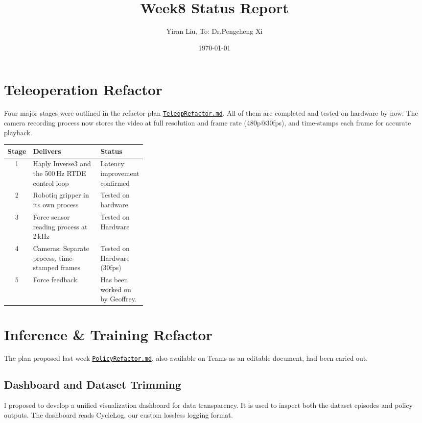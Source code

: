 \documentclass[11pt]{article}
\title{Week8 Status Report}
\author{Yiran Liu, To: Dr.Pengcheng Xi}
\date{\today}
\begin{document}
\maketitle

\section{Teleoperation Refactor}

Four major stages were outlined in the refactor plan \href{https://gitlabc.nrc-cnrc.gc.ca/Yiran.Liu/nrc_robot_manipulation/-/blob/teleop-refactor/Documentation/Journal/2026Sep/TeleopRefactor.md}{\texttt{TeleopRefactor.md}}. All of them are completed and tested on hardware by now. The camera recording process now stores the video at full resolution and frame rate (480p@30fps), and time-stamps each frame for accurate playback. 

\begin{table}[H]
\centering\small
\begin{tabularx}{\linewidth}{@{}c>{\raggedright\arraybackslash}X>{\raggedright\arraybackslash}p{0.33\linewidth}@{}}
\toprule
Stage & Delivers & Status \\
\midrule
1 & Haply Inverse3 and the 500\,Hz RTDE control loop
  & Latency improvement confirmed \\
2 & Robotiq gripper in its own process
  & Tested on hardware \\
3 & Force sensor reading process at 2\,kHz
  & Tested on Hardware  \\
4 & Cameras: Separate process, time-stamped frames
  & Tested on Hardware (30fps) \\
5 & Force feedback.
  & Has been worked on by Geoffrey. \\
\bottomrule
\end{tabularx}
\end{table}

\section{Inference \& Training Refactor}
\label{sec:policy}

The plan proposed last week
\href{https://gitlabc.nrc-cnrc.gc.ca/Yiran.Liu/nrc_robot_manipulation/-/blob/teleop-refactor/Documentation/Journal/2026Oct/PolicyRefactor.md}{\texttt{PolicyRefactor.md}}, also available on Teams as an editable document, had been caried out.

\subsection{Dashboard and Dataset Trimming}
I proposed to develop a unified visualization dashboard for data transparency. It is used to inspect both the dataset episodes and policy outputs. The dashboard reads CycleLog, our custom lossless logging format. 
\end{document}
